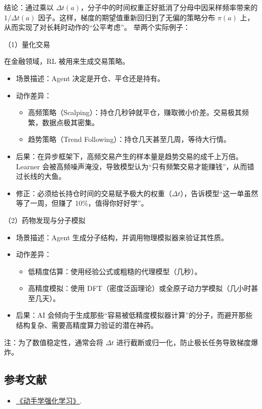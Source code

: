 结论：通过乘以 \(\Delta t(a)\)，分子中的时间权重正好抵消了分母中因采样频率带来的 \(1/\Delta t(a)\) 因子。这样，梯度的期望值重新回归到了无偏的策略分布 \(\pi(a)\) 上，从而实现了对长耗时动作的``公平考虑''。
举两个实际例子：

（1）量化交易

在金融领域，RL 被用来生成交易策略。

\begin{itemize}
\tightlist
\item
  场景描述：Agent 决定是开仓、平仓还是持有。
\item
  动作差异：

  \begin{itemize}
  \tightlist
  \item
    高频策略（Scalping）：持仓几秒钟就平仓，赚取微小价差。交易极其频繁，数据点极其密集。
  \item
    趋势策略（Trend Following）：持仓几天甚至几周，等待大行情。
  \end{itemize}
\item
  后果：在异步框架下，高频交易产生的样本量是趋势交易的成千上万倍。Learner 会被高频噪声淹没，导致模型认为``只有频繁交易才能赚钱''，从而错过长线的大鱼。
\item
  修正：必须给长持仓时间的交易赋予极大的权重（\(\Delta t\)），告诉模型``这一单虽然等了一周，但赚了 10\%，值得你好好学''。
\end{itemize}

（2）药物发现与分子模拟

\begin{itemize}
\tightlist
\item
  场景描述：Agent 生成分子结构，并调用物理模拟器来验证其性质。
\item
  动作差异：

  \begin{itemize}
  \tightlist
  \item
    低精度估算：使用经验公式或粗糙的代理模型（几秒）。
  \item
    高精度模拟：使用 DFT（密度泛函理论）或全原子动力学模拟（几小时甚至几天）。
  \end{itemize}
\item
  后果：AI 会倾向于生成那些``容易被低精度模拟器计算''的分子，而避开那些结构复杂、需要高精度算力验证的潜在神药。
\end{itemize}

注：为了数值稳定性，通常会将 \(\Delta t\) 进行截断或归一化，防止极长任务导致梯度爆炸。

\hypertarget{ux53c2ux8003ux6587ux732e-43}{%
\subsection{参考文献}\label{ux53c2ux8003ux6587ux732e-43}}

\begin{itemize}
\tightlist
\item
  \href{https://hrl.boyuai.com/}{《动手学强化学习》}.
\end{itemize}

\clearpage
